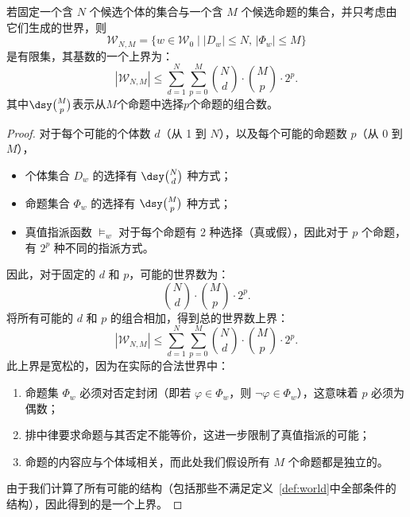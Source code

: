 \begin{theorem}[有限世界集合的基数上界]
    若固定一个含 $N$ 个候选个体的集合与一个含 $M$ 个候选命题的集合，并只考虑由它们生成的世界，则
    \begin{equation}
        \mathcal{W}_{N,M}=\{w\in\mathcal{W}_0\mid |D_w|\leq N,\,|\Phi_w|\leq M\}
    \end{equation}
    是有限集，其基数的一个上界为：
    \begin{equation}
        |\mathcal{W}_{N,M}| \leq \sum_{d=1}^{N} \sum_{p=0}^{M} \binom{N}{d} \cdot \binom{M}{p} \cdot 2^{p}.
    \end{equation}
    其中\(\dsy\binom{M}{p}\)表示从\(M\)个命题中选择\(p\)个命题的组合数。
\end{theorem}
\begin{proof}
    对于每个可能的个体数 \(d\)（从 1 到 \(N\)），以及每个可能的命题数 \(p\)（从 0 到 \(M\)），
    \begin{itemize}
        \item 个体集合 \(D_w\) 的选择有 \(\dsy\binom{N}{d}\) 种方式；
        \item 命题集合 \(\Phi_w\) 的选择有 \(\dsy\binom{M}{p}\) 种方式；
        \item 真值指派函数 \(\models_w\) 对于每个命题有 2 种选择（真或假），因此对于 \(p\) 个命题，有 \(2^p\) 种不同的指派方式。
    \end{itemize}
    因此，对于固定的 \(d\) 和 \(p\)，可能的世界数为：
    \begin{equation}
        \binom{N}{d} \cdot \binom{M}{p} \cdot 2^p.
    \end{equation}
    将所有可能的 \(d\) 和 \(p\) 的组合相加，得到总的世界数上界：
    \begin{equation}
        |\mathcal{W}_{N,M}| \leq \sum_{d=1}^{N} \sum_{p=0}^{M} \binom{N}{d} \cdot \binom{M}{p} \cdot 2^{p}.
    \end{equation}
    此上界是宽松的，因为在实际的合法世界中：
    \begin{enumerate}
        \item 命题集 \(\Phi_w\) 必须对否定封闭（即若 \(\varphi \in \Phi_w\)，则 \(\neg\varphi \in \Phi_w\)），这意味着 \(p\) 必须为偶数；
        \item 排中律要求命题与其否定不能等价，这进一步限制了真值指派的可能；
        \item 命题的内容应与个体域相关，而此处我们假设所有 \(M\) 个命题都是独立的。
    \end{enumerate}
    由于我们计算了所有可能的结构（包括那些不满足定义~\ref{def:world}中全部条件的结构），因此得到的是一个上界。
\end{proof}


